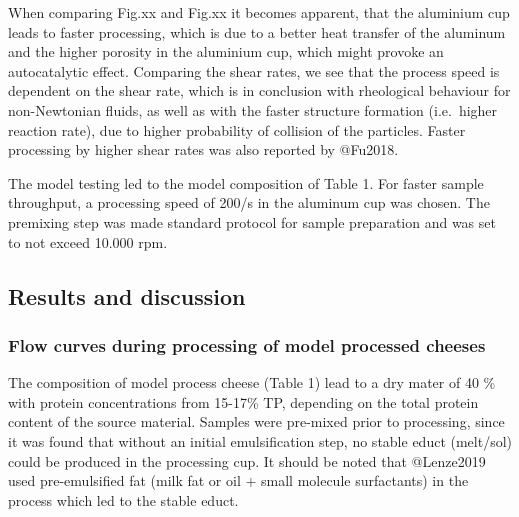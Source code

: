 \documentclass[
]{article}
\begin{document}
When comparing Fig.xx and Fig.xx it becomes apparent, that the aluminium
cup leads to faster processing, which is due to a better heat transfer
of the aluminum and the higher porosity in the aluminium cup, which
might provoke an autocatalytic effect. Comparing the shear rates, we see
that the process speed is dependent on the shear rate, which is in
conclusion with rheological behaviour for non-Newtonian fluids, as well
as with the faster structure formation (i.e.~higher reaction rate), due
to higher probability of collision of the particles. Faster processing
by higher shear rates was also reported by @Fu2018.

The model testing led to the model composition of Table 1. For faster
sample throughput, a processing speed of 200/s in the aluminum cup was
chosen. The premixing step was made standard protocol for sample
preparation and was set to not exceed 10.000 rpm.

\newpage
\subsection{Results and discussion}

\subsubsection{Flow curves during processing of model processed cheeses}

The composition of model process cheese (Table 1) lead to a dry mater of
40 \% with protein concentrations from 15-17\% TP, depending on the
total protein content of the source material. Samples were pre-mixed
prior to processing, since it was found that without an initial
emulsification step, no stable educt (melt/sol) could be produced in the
processing cup. It should be noted that @Lenze2019 used pre-emulsified
fat (milk fat or oil + small molecule surfactants) in the process which
led to the stable educt.
\end{document}
